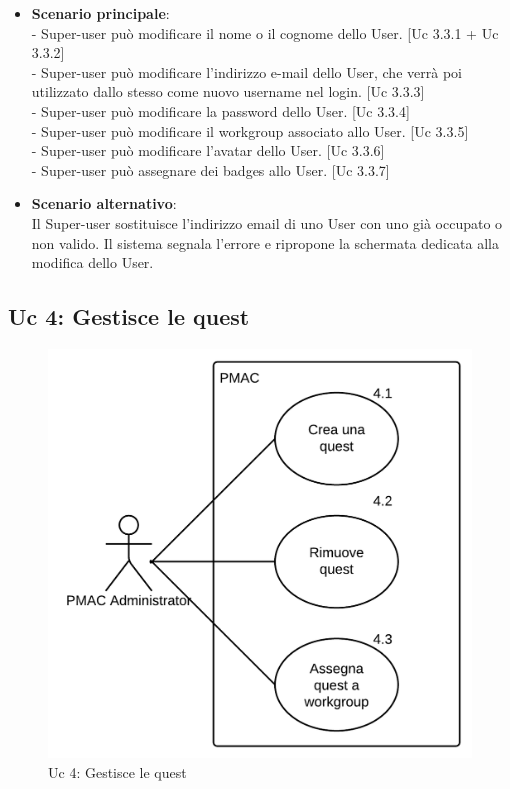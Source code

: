 {\begin{itemize}
\item \textbf{Scenario principale}:\\
- Super-user può modificare il nome o il cognome dello User. [Uc 3.3.1 + Uc 3.3.2]\\
- Super-user può modificare l'indirizzo e-mail dello User, che verrà poi utilizzato dallo stesso come nuovo username nel login. [Uc 3.3.3]\\
- Super-user può modificare la password dello User. [Uc 3.3.4]\\
- Super-user può modificare il workgroup associato allo User. [Uc 3.3.5]\\
- Super-user può modificare l'avatar dello User. [Uc 3.3.6]\\
- Super-user può assegnare dei badges allo User. [Uc 3.3.7]

\item \textbf{Scenario alternativo}:\\
Il Super-user sostituisce l'indirizzo email di uno User con uno già occupato o non valido. Il sistema segnala l'errore e ripropone la schermata dedicata alla modifica dello User.

\end{itemize}

\newpage

\subsection{Uc 4: Gestisce le quest}
\begin{figure}[ht]
\centering
\caption{Uc 4: Gestisce le quest}
\includegraphics[scale=0.9]{images/cap1/UseCase/Uc4} %
\end{figure}

}
